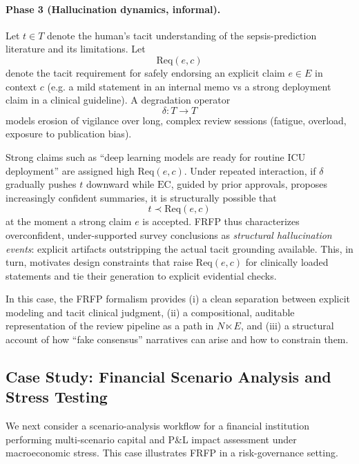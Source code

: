 \paragraph{Phase 3 (Hallucination dynamics, informal).}
Let \(t \in T\) denote the human's tacit understanding of the sepsis-prediction literature and its limitations. Let
\[
  \mathrm{Req}(e,c)
\]
denote the tacit requirement for safely endorsing an explicit claim \(e \in E\) in context \(c\) (e.g. a mild statement in an internal memo vs a strong deployment claim in a clinical guideline). A degradation operator
\[
  \delta: T \to T
\]
models erosion of vigilance over long, complex review sessions (fatigue, overload, exposure to publication bias).

Strong claims such as ``deep learning models are ready for routine ICU deployment'' are assigned high \(\mathrm{Req}(e,c)\). Under repeated interaction, if \(\delta\) gradually pushes \(t\) downward while \(\mathrm{EC}\), guided by prior approvals, proposes increasingly confident summaries, it is structurally possible that
\[
  t \prec \mathrm{Req}(e,c)
\]
at the moment a strong claim \(e\) is accepted. FRFP thus characterizes overconfident, under-supported survey conclusions as \emph{structural hallucination events}: explicit artifacts outstripping the actual tacit grounding available. This, in turn, motivates design constraints that raise \(\mathrm{Req}(e,c)\) for clinically loaded statements and tie their generation to explicit evidential checks.

\medskip

\noindent In this case, the FRFP formalism provides (i) a clean separation between explicit modeling and tacit clinical judgment, (ii) a compositional, auditable representation of the review pipeline as a path in \(N \ltimes E\), and (iii) a structural account of how ``fake consensus'' narratives can arise and how to constrain them.



\subsection{Case Study: Financial Scenario Analysis and Stress Testing}
\label{sec:case-finance}

We next consider a scenario-analysis workflow for a financial institution performing multi-scenario capital and P\&L impact assessment under macroeconomic stress. This case illustrates FRFP in a risk-governance setting.

